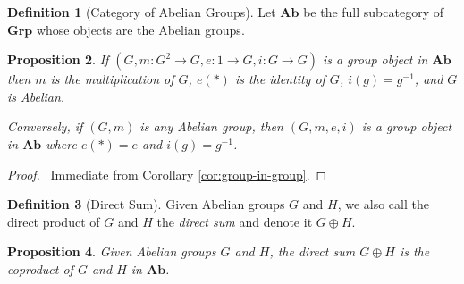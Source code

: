 \documentclass{book}
\let\qed\relax
\newtheorem{prop}{Proposition}[chapter]
\theoremstyle{definition}
\newtheorem{df}[prop]{Definition}
\newcommand{\Ab}{\ensuremath{\mathbf{Ab}}}
\newcommand{\inv}[1]{\ensuremath{{#1}^{-1}}}
\begin{document}
\begin{df}[Category of Abelian Groups]
    Let $\Ab$ be the full subcategory of $\mathbf{Grp}$ whose objects are the Abelian groups.
\end{df}

\begin{prop}
If $(G, m : G^2 \rightarrow G, e : 1 \rightarrow G, i : G \rightarrow G)$ is a group object in $\Ab$ then $m$ is the multiplication of $G$, $e(*)$ is the identity of $G$, $i(g) = \inv{g}$, and $G$ is Abelian.

Conversely, if $(G, m)$ is any Abelian group, then $(G,m,e,i)$ is a group object in $\Ab$ where $e(*) = e$ and $i(g) = \inv{g}$.
\end{prop}

\begin{proof}
\pf\ Immediate from Corollary \ref{cor:group-in-group}. \qed
\end{proof}

\begin{df}[Direct Sum]
    Given Abelian groups $G$ and $H$, we also call the direct product of $G$ and $H$ the \emph{direct sum} and denote it $G \oplus H$.
\end{df}

\begin{prop}
    Given Abelian groups $G$ and $H$, the direct sum $G \oplus H$ is the coproduct of $G$ and $H$ in $\Ab$.
\end{prop}
\end{document}
